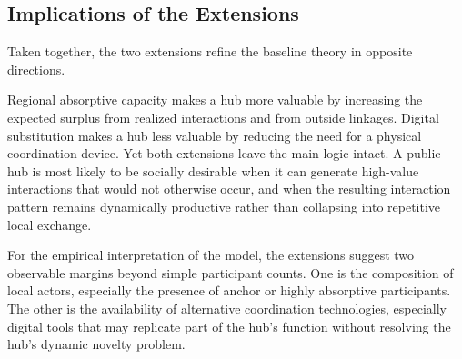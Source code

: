 \subsection{Implications of the Extensions}

Taken together, the two extensions refine the baseline theory in opposite directions.

Regional absorptive capacity makes a hub more valuable by increasing the expected surplus from realized interactions and from outside linkages. Digital substitution makes a hub less valuable by reducing the need for a physical coordination device. Yet both extensions leave the main logic intact. A public hub is most likely to be socially desirable when it can generate high-value interactions that would not otherwise occur, and when the resulting interaction pattern remains dynamically productive rather than collapsing into repetitive local exchange.

For the empirical interpretation of the model, the extensions suggest two observable margins beyond simple participant counts. One is the composition of local actors, especially the presence of anchor or highly absorptive participants. The other is the availability of alternative coordination technologies, especially digital tools that may replicate part of the hub's function without resolving the hub's dynamic novelty problem.
